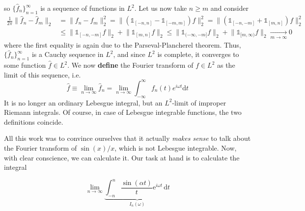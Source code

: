 so \(\{\hat{f}_n\}_{n=1}^{\infty }\) is a sequence of functions in \(L^2\). 
Let us now take \(n \geq m\) and consider
\begin{align*}
    \frac{1}{2\pi }\lVert \hat{f} _n - \hat{f} _m \rVert _2 &= \lVert f_n - f_m \rVert_2^2 = \lVert ( \mathbb{1}_{[-n,n]} - \mathbb{1}_{[-m,m]} ) f \rVert_2^2 
    = \lVert ( \mathbb{1}_{[-n,-m]} + \mathbb{1}_{[m,n]} ) f \rVert_2^2 \\
    &\leq \lVert \mathbb{1}_{[-n,-m]} f \rVert_2 + \lVert \mathbb{1}_{[m,n]} f \rVert_2
    \leq \lVert \mathbb{1}_{(-\infty ,-m]} f \rVert_2 + \lVert \mathbb{1}_{[m,\infty )} f \rVert_2 \xrightarrow[m\to \infty ]{} 0
\end{align*}
where the first equality is again due to the Parseval-Plancherel theorem.
Thus, \(\{\hat{f} _n\}_{n=1}^{\infty}\) is a Cauchy sequence in \(L^2\), and since \(L^2\) is complete, it converges to some
function \(\hat{f} \in L^2\). We now \textbf{define} the Fourier transform of \(f\in L^2\) as the limit of this sequence,
i.e.
\begin{equation}
    \hat{f} \equiv  \lim_{n \to \infty} \hat{f} _n = \lim_{n \to \infty} \int_{-\infty}^{\infty} f_n(t) e^{i \omega t} \mathrm{d}t
\end{equation}  
It is no longer an ordinary Lebesgue integral, but an \(L^2\)-limit of improper Riemann integrals. Of course, in case
of Lebesgue integrable functions, the two definitions coincide. 

All this work was to convince ourselves that it actually \textit{makes sense} to talk about the Fourier transform of
\(\sin (x)/x\), which is not Lebesgue integrable. Now, with clear conscience, we can calculate it.
Our task at hand is to calculate the integral 

\begin{equation}
    \lim_{n \to \infty} \underbrace{\int_{-n}^{n} \frac{\sin (\alpha t)}{t} \mathrm{e}^{i \omega  t} \,\mathrm{d}t}_{I_n(\omega )}
\end{equation}

